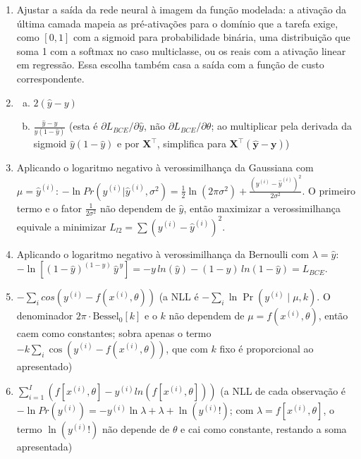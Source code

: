 \documentclass{dlproblemset}
\begin{document}
\begin{enumerate}[1)]
    \item Ajustar a saída da rede neural à imagem da função modelada: a ativação da última camada mapeia as pré-ativações para o domínio que a tarefa exige, como $[0,1]$ com a sigmoid para probabilidade binária, uma distribuição que soma 1 com a softmax no caso multiclasse, ou os reais com a ativação linear em regressão. Essa escolha também casa a saída com a função de custo correspondente.

    \item
    \begin{enumerate}[a)]
    \item $2(\hat{y}-y)$
    \item $\frac{\hat{y}-y}{\hat{y}(1-\hat{y})}$ \quad ({\footnotesize esta é $\partial L_{BCE} / \partial \hat y$, não $\partial L_{BCE} / \partial \theta$; ao multiplicar pela derivada da sigmoid $\hat y(1-\hat y)$ e por $\mathbf{X}^\top$, simplifica para $\mathbf{X}^\top(\hat{\mathbf{y}} - \mathbf{y})$})
    \end{enumerate}

    \item Aplicando o logaritmo negativo à verossimilhança da Gaussiana com $\mu = \hat{y}^{(i)}$: $-\ln Pr(y^{(i)}|\hat{y}^{(i)},\sigma^2) = \frac{1}{2}\ln(2\pi\sigma^2) + \frac{(y^{(i)}-\hat{y}^{(i)})^2}{2\sigma^2}$. O primeiro termo e o fator $\frac{1}{2\sigma^2}$ não dependem de $\hat{y}$, então maximizar a verossimilhança equivale a minimizar $L_{l2}=\sum\left(y^{(i)}-\hat{y}^{(i)}\right)^2$.
    \item Aplicando o logaritmo negativo à verossimilhança da Bernoulli com $\lambda = \hat{y}$: $-\ln\left[(1-\hat{y})^{(1-y)}\,\hat{y}^{\,y}\right] = -y\,ln(\hat{y})-(1-y)\,ln(1-\hat{y}) = L_{BCE}$.

    \item {} $-\sum_{i} cos(y^{(i)}-f(x^{(i)},\theta))$ \quad ({\footnotesize a NLL é $-\sum_i \ln \Pr(y^{(i)}\mid \mu, k)$. O denominador $2\pi \cdot \mathrm{Bessel}_0[k]$ e o $k$ não dependem de $\mu = f(x^{(i)},\theta)$, então caem como constantes; sobra apenas o termo $-k\sum_i \cos(y^{(i)} - f(x^{(i)},\theta))$, que com $k$ fixo é proporcional ao apresentado})

    \item {} $\sum _{i=1}^{I}(f[x^{(i)},\theta] - y^{(i)}ln(f[x^{(i)},\theta]))$ \quad ({\footnotesize a NLL de cada observação é $-\ln Pr(y^{(i)}) = -y^{(i)}\ln\lambda + \lambda + \ln(y^{(i)}!)$; com $\lambda = f[x^{(i)},\theta]$, o termo $\ln(y^{(i)}!)$ não depende de $\theta$ e cai como constante, restando a soma apresentada})


\end{enumerate}
\end{document}
